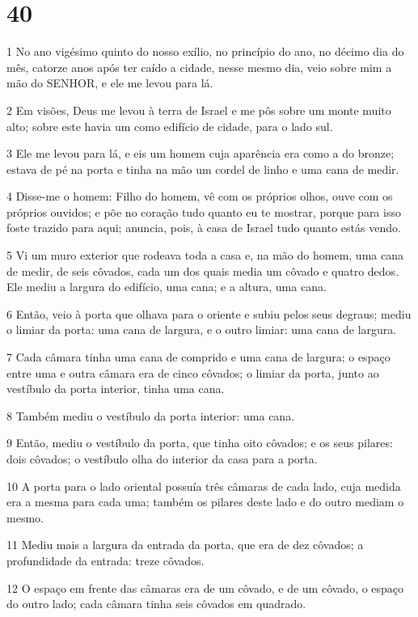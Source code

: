 \chapter{40}

\par 1 No ano vigésimo quinto do nosso exílio, no princípio do ano, no décimo dia do mês, catorze anos após ter caído a cidade, nesse mesmo dia, veio sobre mim a mão do SENHOR, e ele me levou para lá.
\par 2 Em visões, Deus me levou à terra de Israel e me pôs sobre um monte muito alto; sobre este havia um como edifício de cidade, para o lado sul.
\par 3 Ele me levou para lá, e eis um homem cuja aparência era como a do bronze; estava de pé na porta e tinha na mão um cordel de linho e uma cana de medir.
\par 4 Disse-me o homem: Filho do homem, vê com os próprios olhos, ouve com os próprios ouvidos; e põe no coração tudo quanto eu te mostrar, porque para isso foste trazido para aqui; anuncia, pois, à casa de Israel tudo quanto estás vendo.
\par 5 Vi um muro exterior que rodeava toda a casa e, na mão do homem, uma cana de medir, de seis côvados, cada um dos quais media um côvado e quatro dedos. Ele mediu a largura do edifício, uma cana; e a altura, uma cana.
\par 6 Então, veio à porta que olhava para o oriente e subiu pelos seus degraus; mediu o limiar da porta: uma cana de largura, e o outro limiar: uma cana de largura.
\par 7 Cada câmara tinha uma cana de comprido e uma cana de largura; o espaço entre uma e outra câmara era de cinco côvados; o limiar da porta, junto ao vestíbulo da porta interior, tinha uma cana.
\par 8 Também mediu o vestíbulo da porta interior: uma cana.
\par 9 Então, mediu o vestíbulo da porta, que tinha oito côvados; e os seus pilares: dois côvados; o vestíbulo olha do interior da casa para a porta.
\par 10 A porta para o lado oriental possuía três câmaras de cada lado, cuja medida era a mesma para cada uma; também os pilares deste lado e do outro mediam o mesmo.
\par 11 Mediu mais a largura da entrada da porta, que era de dez côvados; a profundidade da entrada: treze côvados.
\par 12 O espaço em frente das câmaras era de um côvado, e de um côvado, o espaço do outro lado; cada câmara tinha seis côvados em quadrado.

